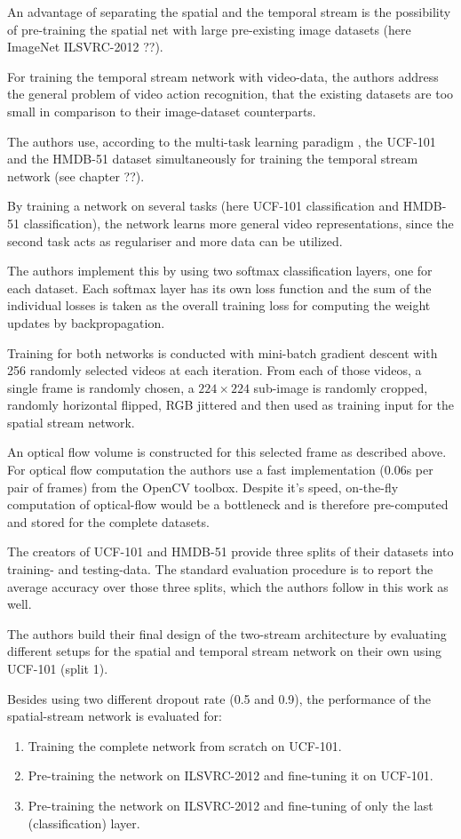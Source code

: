 An advantage of separating the spatial and the temporal stream is the possibility of pre-training the spatial net with large pre-existing image datasets (here ImageNet ILSVRC-2012 ??).

For training the temporal stream network with video-data, the authors address the general problem of video action recognition, that the existing datasets are too small in comparison to their image-dataset counterparts.

The authors use, according to the multi-task learning paradigm \cite{collobert_unified_2008}, the UCF-101 and the HMDB-51 dataset simultaneously for training the temporal stream network (see chapter ??). 

By training a network on several tasks (here UCF-101 classification and HMDB-51 classification), the network learns more general video representations, since the second task acts as regulariser and more data can be utilized.

The authors implement this by using two softmax classification layers, one for each dataset. Each softmax layer has its own loss function and the sum of the individual losses is taken as the overall training loss for computing the weight updates by backpropagation.

Training for both networks is conducted with mini-batch gradient descent with 256 randomly selected videos at each iteration. From each of those videos, a single frame is randomly chosen, a $224 \times 224$ sub-image is randomly cropped, randomly horizontal flipped, RGB jittered and then used as training input for the spatial stream network.

An optical flow volume is constructed for this selected frame as described above. For optical flow computation the authors use a fast implementation (0.06s per pair of frames) from the OpenCV toolbox. Despite it's speed, on-the-fly computation of optical-flow would be a bottleneck and is therefore pre-computed and stored for the complete datasets.

The creators of UCF-101 and HMDB-51 provide three splits of their datasets into training- and testing-data. The standard evaluation procedure is to report the average accuracy over those three splits, which the authors follow in this work as well.

The authors build their final design of the two-stream architecture by evaluating different setups for the spatial and temporal stream network on their own using UCF-101 (split 1).

Besides using two different dropout rate (0.5 and 0.9), the performance of the spatial-stream network is evaluated for:
\begin{enumerate}
    \item Training the complete network from scratch on UCF-101.
    \item Pre-training the network on ILSVRC-2012 and fine-tuning it on UCF-101.
    \item Pre-training the network on ILSVRC-2012 and fine-tuning of only the last (classification) layer.
\end{enumerate}

